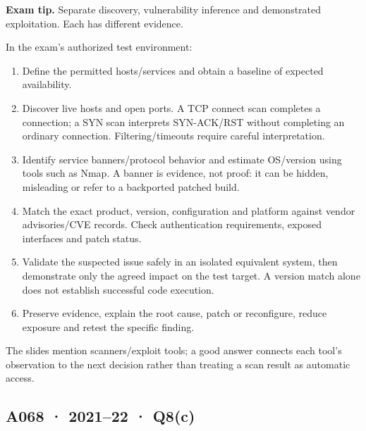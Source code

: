 \documentclass[11pt,a4paper]{article}
\begin{document}
{\color{ForestGreen}\textbf{Exam tip.} Separate discovery,\allowbreak{} vulnerability inference and demonstrated exploitation. Each has different evidence.}


In the exam's authorized test environment:



\begin{enumerate}

\item Define the permitted hosts/\allowbreak{}services and obtain a baseline of expected availability.

\item Discover live hosts and open ports. A TCP connect scan completes a connection; a SYN scan interprets SYN-ACK/\allowbreak{}RST without completing an ordinary connection. Filtering/\allowbreak{}timeouts require careful interpretation.

\item Identify service banners/\allowbreak{}protocol behavior and estimate OS/\allowbreak{}version using tools such as Nmap. A banner is evidence,\allowbreak{} not proof: it can be hidden,\allowbreak{} misleading or refer to a backported patched build.

\item Match the exact product,\allowbreak{} version,\allowbreak{} configuration and platform against vendor advisories/\allowbreak{}CVE records. Check authentication requirements,\allowbreak{} exposed interfaces and patch status.

\item Validate the suspected issue safely in an isolated equivalent system,\allowbreak{} then demonstrate only the agreed impact on the test target. A version match alone does not establish successful code execution.

\item Preserve evidence,\allowbreak{} explain the root cause,\allowbreak{} patch or reconfigure,\allowbreak{} reduce exposure and retest the specific finding.

\end{enumerate}

The slides mention scanners/\allowbreak{}exploit tools; a good answer connects each tool's observation to the next decision rather than treating a scan result as automatic access.




\clearpage
\subsection{A068 · 2021–22 · Q8(c)}\label{a068}
\end{document}
